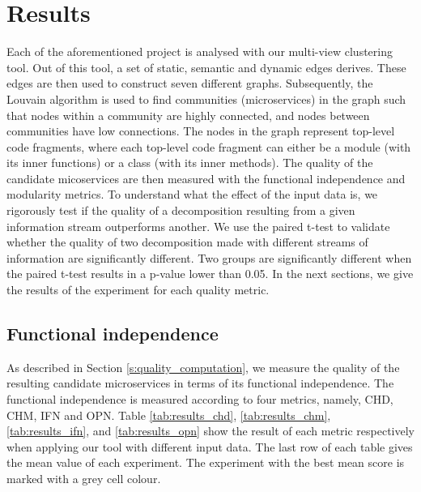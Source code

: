 

\section{Results}
Each of the aforementioned project is analysed with our multi-view clustering tool. Out of this tool, a set of static, semantic and dynamic edges derives. These edges are then used to construct seven different graphs. Subsequently, the Louvain algorithm is used to find communities (microservices) in the graph such that nodes within a community are highly connected, and nodes between communities have low connections. The nodes in the graph represent top-level code fragments, where each top-level code fragment can either be a module (with its inner functions) or a class (with its inner methods). The quality of the candidate micoservices are then measured with the functional independence and modularity metrics. To understand what the effect of the input data is, we rigorously test if the quality of a decomposition resulting from a given information stream outperforms another. We use the paired t-test to validate whether the quality of two decomposition made with different streams of information are significantly different. Two groups are significantly different when the paired t-test results in a p-value lower than 0.05. In the next sections, we give the results of the experiment for each quality metric. \par

\subsection{Functional independence}
As described in Section \ref{s:quality_computation}, we measure the quality of the resulting candidate microservices in terms of its functional independence. The functional independence is measured according to four metrics, namely, CHD, CHM, IFN and OPN. Table \ref{tab:results_chd}, \ref{tab:results_chm}, \ref{tab:results_ifn}, and \ref{tab:results_opn} show the result of each metric respectively when applying our tool with different input data. The last row of each table gives the mean value of each experiment. The experiment with the best mean score is marked with a grey cell colour.

